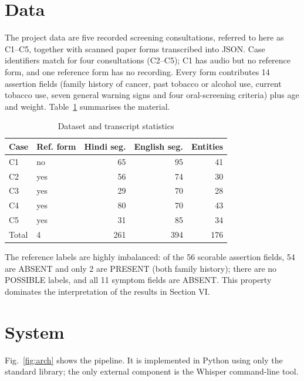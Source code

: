 \documentclass[conference]{IEEEtran}
\begin{document}
\section{Data}
The project data are five recorded screening consultations, referred to here as C1–C5, together with scanned paper forms transcribed into JSON. Case identifiers match for four consultations (C2–C5); C1 has audio but no reference form, and one reference form has no recording. Every form contributes 14 assertion fields (family history of cancer, past tobacco or alcohol use, current tobacco use, seven general warning signs and four oral-screening criteria) plus age and weight. Table~\ref{tab:data} summarises the material.

\begin{table}[!t]
\centering\footnotesize
\caption{Dataset and transcript statistics}\label{tab:data}
\begin{tabular}{llrrr}
\toprule
\textbf{Case} & \textbf{Ref. form} & \textbf{Hindi seg.} & \textbf{English seg.} & \textbf{Entities} \\
\midrule
C1 & no & 65 & 95 & 41 \\
C2 & yes & 56 & 74 & 30 \\
C3 & yes & 29 & 70 & 28 \\
C4 & yes & 80 & 70 & 43 \\
C5 & yes & 31 & 85 & 34 \\
\midrule
Total & 4 & 261 & 394 & 176 \\
\bottomrule
\end{tabular}
\end{table}

The reference labels are highly imbalanced: of the 56 scorable assertion fields, 54 are ABSENT and only 2 are PRESENT (both family history); there are no POSSIBLE labels, and all 11 symptom fields are ABSENT. This property dominates the interpretation of the results in Section VI.

\section{System}
Fig.~\ref{fig:arch} shows the pipeline. It is implemented in Python using only the standard library; the only external component is the Whisper command-line tool.
\end{document}
